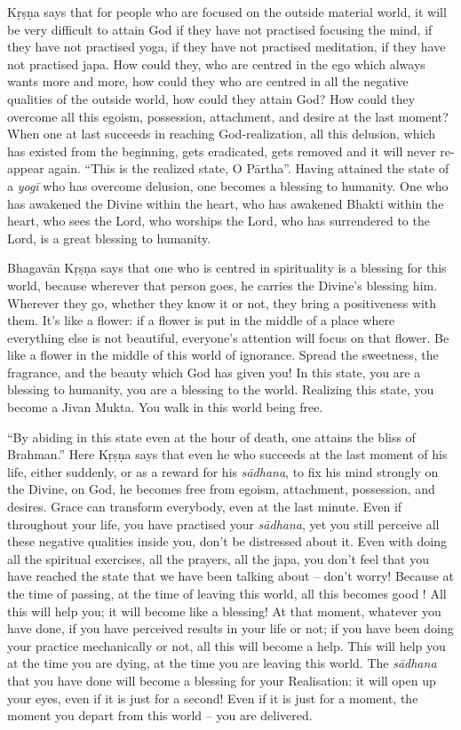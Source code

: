 Kṛṣṇa says that for people who are focused on the outside material world, it will be very difficult to attain God if they have not practised focusing the mind, if they have not practised yoga, if they have not practised meditation, if they have not practised japa. How could they, who are centred in the ego which always wants more and more, how could they who are centred in all the negative qualities of the outside world, how could they attain God? How could they overcome all this egoism, possession, attachment, and desire at the last moment? When one at last succeeds in reaching God-realization, all this delusion, which has existed from the beginning, gets eradicated, gets removed and it will never re-appear again. “This is the realized state, O Pārtha”. Having attained the state of a \textit{yogī} who has overcome delusion, one becomes a blessing to humanity. One who has awakened the Divine within the heart, who has awakened Bhakti within the heart, who sees the Lord, who worships the Lord, who has surrendered to the Lord, is a great blessing to humanity.

Bhagavān Kṛṣṇa says that one who is centred in spirituality is a blessing for this world, because wherever that person goes, he carries the Divine’s blessing him. Wherever they go, whether they know it or not, they bring a positiveness with them. It’s like a flower: if a flower is put in the middle of a place where everything else is not beautiful, everyone’s attention will focus on that flower. Be like a flower in the middle of this world of ignorance. Spread the sweetness, the fragrance, and the beauty which God has given you! In this state, you are a blessing to humanity, you are a blessing to the world. Realizing this state, you become a Jivan Mukta. You walk in this world being free.

“By abiding in this state even at the hour of death, one attains the bliss of Brahman.” Here Kṛṣṇa says that even he who succeeds at the last moment of his life, either suddenly, or as a reward for his \textit{sādhana}, to fix his mind strongly on the Divine, on God, he becomes free from egoism, attachment, possession, and desires. Grace can transform everybody, even at the last minute. Even if throughout your life, you have practised your \textit{sādhana}, yet you still perceive all these negative qualities inside you, don’t be distressed about it. Even with doing all the spiritual exercises, all the prayers, all the japa, you don’t feel that you have reached the state that we have been talking about – don’t worry! Because at the time of passing, at the time of leaving this world, all this becomes good ! All this will help you; it will become like a blessing! At that moment, whatever you have done, if you have perceived results in your life or not; if you have been doing your practice mechanically or not, all this will become a help. This will help you at the time you are dying, at the time you are leaving this world. The \textit{sādhana} that you have done will become a blessing for your Realisation: it will open up your eyes, even if it is just for a second! Even if it is just for a moment, the moment you depart from this world – you are delivered.

